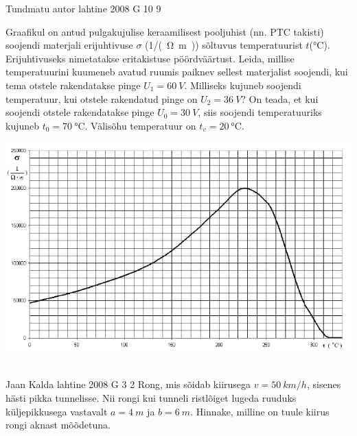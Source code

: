 \documentclass[11pt, twoside]{article}
\begin{document}
{%
{Tundmatu autor} %
{lahtine} %
{2008} %
{G 10} %
{9} %
{
\ifStatement
Graafikul on antud pulgakujulise keraamilisest pooljuhist (nn. PTC takisti) soojendi materjali erijuhtivuse $\sigma$ (\si{1/(\ohm. m)}) sõltuvus temperatuurist $t$(\si{\celsius}). Erijuhtivuseks nimetatakse eritakistuse pöördväärtust. Leida, millise temperatuurini kuumeneb avatud ruumis paiknev sellest materjalist soojendi, kui tema otstele rakendatakse pinge $U_1 = \SI{60}{V}$. Milliseks kujuneb soojendi temperatuur, kui otstele rakendatud pinge on $U_2 = \SI{36}{V}$? On teada, et kui soojendi otstele rakendatakse pinge $U_0 = \SI{30}{V}$, siis soojendi temperatuuriks kujuneb $t_0= \SI{70}{\celsius}$. Välisõhu temperatuur on $t_v = \SI{20}{\celsius}$.

\begin{center}
	\includegraphics[width=\linewidth]{2008-lahg-10-yl}
\end{center}
\fi
}
\newpage\subsection{\protect{}}

{Jaan Kalda} %
{lahtine} %
{2008} %
{G 3} %
{2} %
{
\ifStatement
Rong, mis sõidab kiirusega $v = \SI{50}{km/h}$, sisenes hästi pikka tunnelisse. Nii rongi kui tunneli ristlõiget lugeda ruuduks küljepikkusega vastavalt $a = \SI{4}{m}$ ja $b = \SI{6}{m}$. Hinnake, milline on tuule kiirus rongi aknast mõõdetuna.
\fi
}

}
\end{document}
